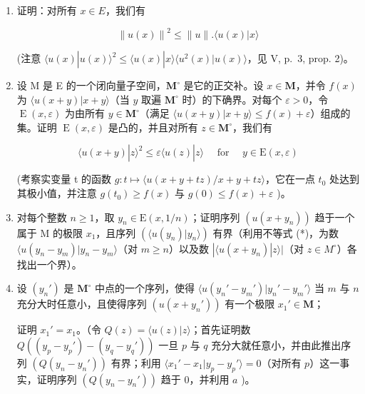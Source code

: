 \begin{enumerate}
\def\labelenumi{\alph{enumi})}
\tightlist
\item
  证明：对所有 \(x \in E\)，我们有

\[
\left\| u (x) \right\| ^ {2} \leqslant \| u \|. \langle u (x) | x \rangle
\]

(注意 \(\langle u(x)|u(x)\rangle^2\leqslant \langle u(x)|x\rangle \langle u^2 (x)|u(x)\rangle\)，见 V, p.~3, prop. 2)。
\item
  设 M 是 E 的一个闭向量子空间，\(\mathbf{M}^{\circ}\) 是它的正交补。设 \(x\in \mathbf{M}\)，并令 \(f(x)\) 为 \(\langle u(x + y)|x + y\rangle\)（当 \(y\) 取遍 \(\mathbf{M}^{\circ}\) 时）的下确界。对每个 \(\varepsilon >0\)，令 \(\operatorname {E}(x,\varepsilon)\) 为由所有 \(y\in \mathbf{M}^{\circ}\)（满足 \(\langle u(x + y)|x + y\rangle \leqslant f(x) + \varepsilon\)）组成的集。证明 \(\operatorname {E}(x,\varepsilon)\) 是凸的，并且对所有 \(z\in \mathbf{M}^{\circ}\)，我们有

\[
\langle u (x + y) | z \rangle^ {2} \leqslant \varepsilon \langle u (z) | z \rangle \quad \text { for } \quad y \in \mathrm{E} (x, \varepsilon)\tag{*}
\]

(考察实变量 t 的函数 \(g:t \mapsto \langle u(x + y + tz)/x + y + tz \rangle\)，它在一点 \(t_{0}\) 处达到其极小值，并注意 \(g(t_{0}) \geqslant f(x)\) 与 \(g(0) \leqslant f(x) + \varepsilon\) )。
\item
  对每个整数 \(n \geqslant 1\)，取 \(y_{n} \in \mathrm{E}(x, 1/n)\)；证明序列 \((u(x + y_{n}))\) 趋于一个属于 M 的极限 \(x_{1}\)，且序列 \((\langle u(y_{n})|y_{n}\rangle)\) 有界（利用不等式 (*)，为数 \(\langle u(y_{n} - y_{m})|y_{n} - y_{m}\rangle\)（对 \(m \geqslant n\)）以及数 \(|\langle u(x + y_{n})|z\rangle|\)（对 \(z \in M^{\circ}\)）各找出一个界）。

\item
  设 \((y_n')\) 是 \(\mathbf{M}^\circ\) 中点的一个序列，使得 \(\langle u(y_n' - y_m')|y_n' - y_m'\rangle\) 当 \(m\) 与 \(n\) 充分大时任意小，且使得序列 \((u(x + y_n'))\) 有一个极限 \(x_1' \in \mathbf{M}\)；

证明 \(x_1' = x_1\)。（令 \(Q(z) = \langle u(z)|z \rangle\)；首先证明数 \(Q((y_p - y_p') - (y_q - y_q'))\) 一旦 \(p\) 与 \(q\) 充分大就任意小，并由此推出序列 \((Q(y_n - y_n'))\) 有界；利用 \(\langle x_1' - x_1|y_p - y_p' \rangle = 0\)（对所有 \(p\)）这一事实，证明序列 \((Q(y_n - y_n'))\) 趋于 0，并利用 \(a\) )。


\end{enumerate}
